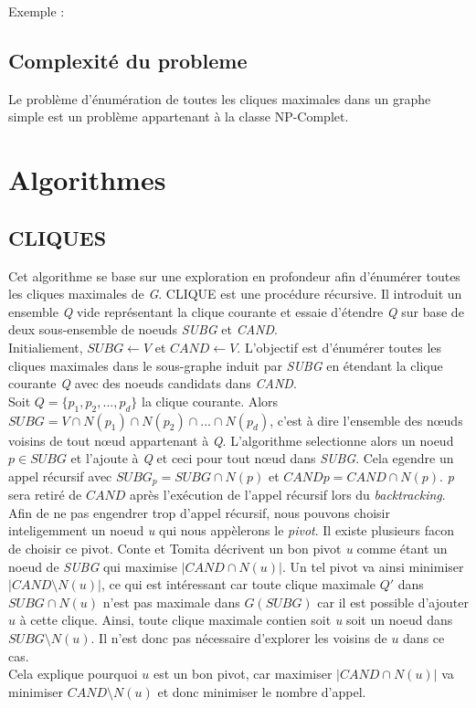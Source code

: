 \documentclass[a4paper, 12pt]{article}
\begin{document}
Exemple :

\subsection{Complexité du probleme}
Le problème d'énumération de toutes les cliques maximales dans un graphe simple est un problème appartenant à la classe NP-Complet.


\section{Algorithmes}

\subsection{CLIQUES}


Cet algorithme se base sur une exploration en profondeur afin d'énumérer toutes les cliques maximales de \emph{G}.
CLIQUE est une procédure récursive. Il introduit un ensemble \emph{Q} vide représentant la clique courante et essaie d'étendre \emph{Q} sur base de deux sous-ensemble de noeuds \textit{SUBG} et \textit{CAND}.\\

Initialiement, $ SUBG \leftarrow V $ et $ CAND \leftarrow V $. L'objectif est d'énumérer toutes les cliques maximales dans le sous-graphe induit par \emph{SUBG} en étendant la clique courante \emph{Q} avec des noeuds candidats dans \emph{CAND}. \\

Soit $ Q = \{p_1, p_2, ..., p_d\} $ la clique courante.
Alors $ SUBG = V \cap N(p_1) \cap N(p_2) \cap ... \cap N(p_d)$, c'est à dire l'ensemble des nœuds voisins de tout
nœud appartenant à \emph{Q}. L'algorithme selectionne alors  un noeud $ p \in SUBG $ et l'ajoute à \emph{Q} et
ceci pour tout nœud dans \emph{SUBG}. Cela egendre un appel récursif avec $ SUBG_p = SUBG \cap N(p) $ et $ CANDp = CAND \cap N(p) $. \emph{p} sera retiré de $ CAND $ après l'exécution de l'appel récursif lors du \textit{backtracking}. \\


Afin de ne pas engendrer trop d'appel récursif, nous pouvons choisir
inteligemment un noeud \textit{u} qui nous appèlerons le \textit{pivot}. Il existe plusieurs facon de choisir
ce pivot. Conte et Tomita\cite{contetomita} décrivent un bon pivot \emph{u} comme étant un noeud de
\emph{SUBG} qui maximise $ | CAND \cap N(u) |$. Un tel pivot va ainsi minimiser $ |CAND \setminus N(u)| $, ce
qui est intéressant car toute clique maximale $ Q' $ dans $ SUBG \cap N(u) $ n'est pas maximale dans
$ G(SUBG) $ car il est possible d'ajouter $ u $ à cette clique. Ainsi, toute clique maximale contien soit
\textit{u} soit un noeud dans $ SUBG \setminus N(u)$. Il n'est donc pas nécessaire d'explorer les voisins de
$ u $ dans ce cas. \\
Cela explique pourquoi $ u $ est un bon pivot, car maximiser $ | CAND \cap N(u) | $ va minimiser
$ CAND \setminus N(u)$ et donc minimiser le nombre d'appel.
\end{document}

